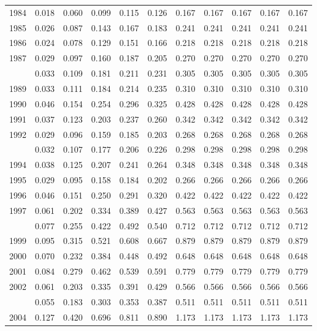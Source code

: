 \documentclass[
]{article}
\begin{document}
\begin{longtable}[t]{lrrrrrrrrrr}
1984 & 0.018 & 0.060 & 0.099 & 0.115 & 0.126 & 0.167 & 0.167 & 0.167 & 0.167 & 0.167\\
1985 & 0.026 & 0.087 & 0.143 & 0.167 & 0.183 & 0.241 & 0.241 & 0.241 & 0.241 & 0.241\\
1986 & 0.024 & 0.078 & 0.129 & 0.151 & 0.166 & 0.218 & 0.218 & 0.218 & 0.218 & 0.218\\
1987 & 0.029 & 0.097 & 0.160 & 0.187 & 0.205 & 0.270 & 0.270 & 0.270 & 0.270 & 0.270\\
\addlinespace
1988 & 0.033 & 0.109 & 0.181 & 0.211 & 0.231 & 0.305 & 0.305 & 0.305 & 0.305 & 0.305\\
1989 & 0.033 & 0.111 & 0.184 & 0.214 & 0.235 & 0.310 & 0.310 & 0.310 & 0.310 & 0.310\\
1990 & 0.046 & 0.154 & 0.254 & 0.296 & 0.325 & 0.428 & 0.428 & 0.428 & 0.428 & 0.428\\
1991 & 0.037 & 0.123 & 0.203 & 0.237 & 0.260 & 0.342 & 0.342 & 0.342 & 0.342 & 0.342\\
1992 & 0.029 & 0.096 & 0.159 & 0.185 & 0.203 & 0.268 & 0.268 & 0.268 & 0.268 & 0.268\\
\addlinespace
1993 & 0.032 & 0.107 & 0.177 & 0.206 & 0.226 & 0.298 & 0.298 & 0.298 & 0.298 & 0.298\\
1994 & 0.038 & 0.125 & 0.207 & 0.241 & 0.264 & 0.348 & 0.348 & 0.348 & 0.348 & 0.348\\
1995 & 0.029 & 0.095 & 0.158 & 0.184 & 0.202 & 0.266 & 0.266 & 0.266 & 0.266 & 0.266\\
1996 & 0.046 & 0.151 & 0.250 & 0.291 & 0.320 & 0.422 & 0.422 & 0.422 & 0.422 & 0.422\\
1997 & 0.061 & 0.202 & 0.334 & 0.389 & 0.427 & 0.563 & 0.563 & 0.563 & 0.563 & 0.563\\
\addlinespace
1998 & 0.077 & 0.255 & 0.422 & 0.492 & 0.540 & 0.712 & 0.712 & 0.712 & 0.712 & 0.712\\
1999 & 0.095 & 0.315 & 0.521 & 0.608 & 0.667 & 0.879 & 0.879 & 0.879 & 0.879 & 0.879\\
2000 & 0.070 & 0.232 & 0.384 & 0.448 & 0.492 & 0.648 & 0.648 & 0.648 & 0.648 & 0.648\\
2001 & 0.084 & 0.279 & 0.462 & 0.539 & 0.591 & 0.779 & 0.779 & 0.779 & 0.779 & 0.779\\
2002 & 0.061 & 0.203 & 0.335 & 0.391 & 0.429 & 0.566 & 0.566 & 0.566 & 0.566 & 0.566\\
\addlinespace
2003 & 0.055 & 0.183 & 0.303 & 0.353 & 0.387 & 0.511 & 0.511 & 0.511 & 0.511 & 0.511\\
2004 & 0.127 & 0.420 & 0.696 & 0.811 & 0.890 & 1.173 & 1.173 & 1.173 & 1.173 & 1.173\\

\end{longtable}
\end{document}
